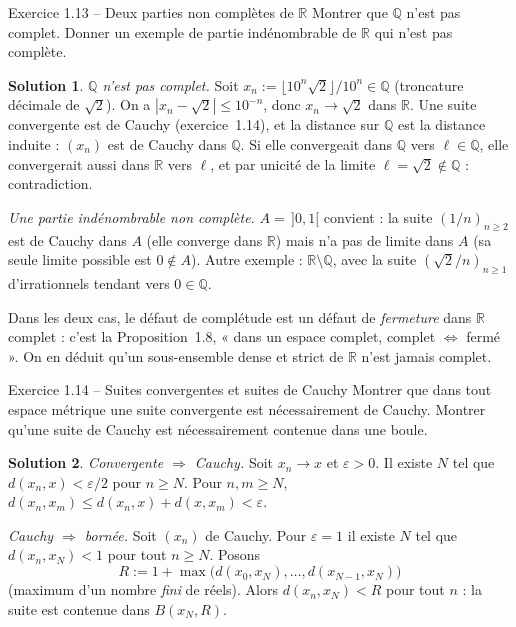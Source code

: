 \documentclass[11pt,a4paper]{article}
\newcommand{\R}{\mathbb{R}}
\newcommand{\Q}{\mathbb{Q}}
\theoremstyle{definition}
\newtheorem*{solution}{Solution}
\begin{document}
\begin{exo}{Exercice 1.13 -- Deux parties non complètes de $\R$}
Montrer que $\Q$ n'est pas complet. Donner un exemple de partie indénombrable de $\R$ qui n'est pas complète.
\end{exo}

\begin{solution}
\emph{$\Q$ n'est pas complet.} Soit $x_n:=\lfloor10^n\sqrt2\rfloor/10^n\in\Q$ (troncature décimale de $\sqrt2$). On a $|x_n-\sqrt2|\le10^{-n}$, donc $x_n\to\sqrt2$ dans $\R$. Une suite convergente est de Cauchy (exercice~1.14), et la distance sur $\Q$ est la distance induite : $(x_n)$ est de Cauchy dans $\Q$. Si elle convergeait dans $\Q$ vers $\ell\in\Q$, elle convergerait aussi dans $\R$ vers $\ell$, et par unicité de la limite $\ell=\sqrt2\notin\Q$ : contradiction.

\emph{Une partie indénombrable non complète.} $A=\,]0,1[$ convient : la suite $(1/n)_{n\ge2}$ est de Cauchy dans $A$ (elle converge dans $\R$) mais n'a pas de limite dans $A$ (sa seule limite possible est $0\notin A$). Autre exemple : $\R\setminus\Q$, avec la suite $(\sqrt2/n)_{n\ge1}$ d'irrationnels tendant vers $0\in\Q$.
\end{solution}

\begin{commentaire}
Dans les deux cas, le défaut de complétude est un défaut de \emph{fermeture} dans $\R$ complet : c'est la Proposition~1.8, « dans un espace complet, complet $\iff$ fermé ». On en déduit qu'un sous-ensemble dense et strict de $\R$ n'est jamais complet.
\end{commentaire}

\begin{exo}{Exercice 1.14 -- Suites convergentes et suites de Cauchy}
Montrer que dans tout espace métrique une suite convergente est nécessairement de Cauchy. Montrer qu'une suite de Cauchy est nécessairement contenue dans une boule.
\end{exo}

\begin{solution}
\emph{Convergente $\Rightarrow$ Cauchy.} Soit $x_n\to x$ et $\varepsilon>0$. Il existe $N$ tel que $d(x_n,x)<\varepsilon/2$ pour $n\ge N$. Pour $n,m\ge N$, $d(x_n,x_m)\le d(x_n,x)+d(x,x_m)<\varepsilon$.

\emph{Cauchy $\Rightarrow$ bornée.} Soit $(x_n)$ de Cauchy. Pour $\varepsilon=1$ il existe $N$ tel que $d(x_n,x_N)<1$ pour tout $n\ge N$. Posons
\[
R:=1+\max\big(d(x_0,x_N),\dots,d(x_{N-1},x_N)\big)
\]
(maximum d'un nombre \emph{fini} de réels). Alors $d(x_n,x_N)<R$ pour tout $n$ : la suite est contenue dans $B(x_N,R)$.
\end{solution}
\end{document}
